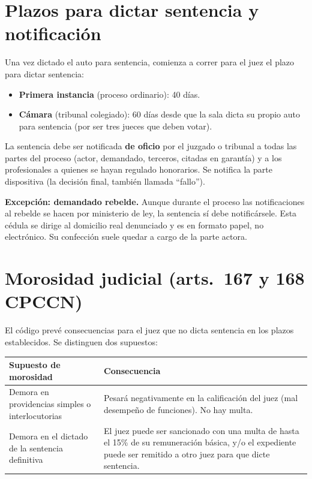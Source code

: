 \documentclass[12pt,oneside]{book}
\begin{document}
\section{Plazos para dictar sentencia y notificación}

Una vez dictado el auto para sentencia, comienza a correr para el juez el plazo para dictar sentencia:

\begin{itemize}
    \item \textbf{Primera instancia} (proceso ordinario): 40 días.
    \item \textbf{Cámara} (tribunal colegiado): 60 días desde que la sala dicta su propio auto para sentencia (por ser tres jueces que deben votar).
\end{itemize}

La sentencia debe ser notificada \textbf{de oficio} por el juzgado o tribunal a todas las partes del proceso (actor, demandado, terceros, citadas en garantía) y a los profesionales a quienes se hayan regulado honorarios. Se notifica la parte dispositiva (la decisión final, también llamada ``fallo'').

\textbf{Excepción: demandado rebelde.} Aunque durante el proceso las notificaciones al rebelde se hacen por ministerio de ley, la sentencia sí debe notificársele. Esta cédula se dirige al domicilio real denunciado y es en formato papel, no electrónico. Su confección suele quedar a cargo de la parte actora.

\section{Morosidad judicial (arts.~167 y 168 CPCCN)}

El código prevé consecuencias para el juez que no dicta sentencia en los plazos establecidos. Se distinguen dos supuestos:

\begin{table}[H]
\centering
\begin{tabularx}{\textwidth}{>{\raggedright\arraybackslash}p{5cm} >{\raggedright\arraybackslash}X}
\toprule
\textbf{Supuesto de morosidad} & \textbf{Consecuencia} \\
\midrule
Demora en providencias simples o interlocutorias & Pesará negativamente en la calificación del juez (mal desempeño de funciones). No hay multa. \\
\addlinespace
Demora en el dictado de la sentencia definitiva & El juez puede ser sancionado con una multa de hasta el 15\% de su remuneración básica, y/o el expediente puede ser remitido a otro juez para que dicte sentencia. \\
\bottomrule
\end{tabularx}
\end{table}
\end{document}
